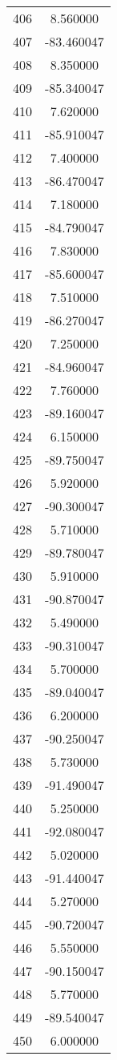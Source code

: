 \documentclass[12pt]{article}
\begin{document}
\begin{longtable}{@{}cc@{}}
406 & 8.560000 \\
407 & -83.460047 \\
408 & 8.350000 \\
409 & -85.340047 \\
410 & 7.620000 \\
411 & -85.910047 \\
412 & 7.400000 \\
413 & -86.470047 \\
414 & 7.180000 \\
415 & -84.790047 \\
416 & 7.830000 \\
417 & -85.600047 \\
418 & 7.510000 \\
419 & -86.270047 \\
420 & 7.250000 \\
421 & -84.960047 \\
422 & 7.760000 \\
423 & -89.160047 \\
424 & 6.150000 \\
425 & -89.750047 \\
426 & 5.920000 \\
427 & -90.300047 \\
428 & 5.710000 \\
429 & -89.780047 \\
430 & 5.910000 \\
431 & -90.870047 \\
432 & 5.490000 \\
433 & -90.310047 \\
434 & 5.700000 \\
435 & -89.040047 \\
436 & 6.200000 \\
437 & -90.250047 \\
438 & 5.730000 \\
439 & -91.490047 \\
440 & 5.250000 \\
441 & -92.080047 \\
442 & 5.020000 \\
443 & -91.440047 \\
444 & 5.270000 \\
445 & -90.720047 \\
446 & 5.550000 \\
447 & -90.150047 \\
448 & 5.770000 \\
449 & -89.540047 \\
450 & 6.000000 \\

\end{longtable}
\end{document}
